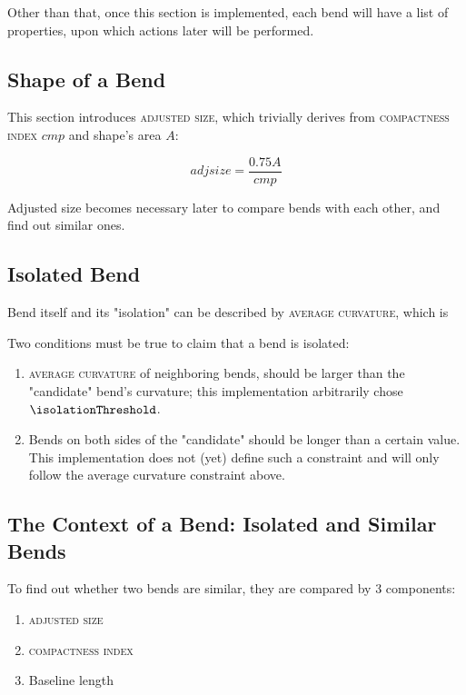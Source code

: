 \documentclass[a4paper]{article}
\begin{document}
Other than that, once this section is implemented, each bend will have a list
of properties, upon which actions later will be performed.

\subsection{Shape of a Bend}

This section introduces \textsc{adjusted size}, which trivially derives from
\textsc{compactness index} $cmp$ and shape's area $A$:

\[
    adjsize = \frac{0.75 A}{cmp}
\]

Adjusted size becomes necessary later to compare bends with each other, and
find out similar ones.

\subsection{Isolated Bend}

Bend itself and its "isolation" can be described by \textsc{average curvature},
which is 

Two conditions must be true to claim that a bend is isolated:

\begin{enumerate}
    \item \textsc{average curvature} of neighboring bends, should be larger
        than the "candidate" bend's curvature; this implementation arbitrarily
        chose $\isolationThreshold$.

    \item Bends on both sides of the "candidate" should be longer than a
        certain value. This implementation does not (yet) define such a
        constraint and will only follow the average curvature constraint above.
\end{enumerate}

\subsection{The Context of a Bend: Isolated and Similar Bends}

To find out whether two bends are similar, they are compared by 3 components:

\begin{enumerate}
    \item \textsc{adjusted size}
    \item \textsc{compactness index}
    \item Baseline length
\end{enumerate}
\end{document}
